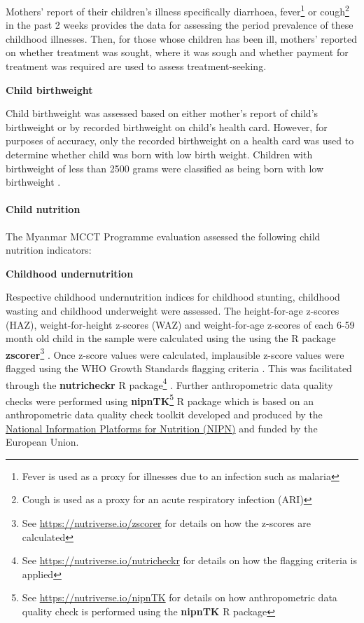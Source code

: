 \documentclass[12pt,a4paper]{article}
\let\oldparagraph\paragraph
\renewcommand{\paragraph}[1]{\oldparagraph{#1}\mbox{}}
\let\rmarkdownfootnote\footnote%
\def\footnote{\protect\rmarkdownfootnote}
\begin{document}
Mothers' report of their children's illness specifically diarrhoea, fever\footnote{Fever is used as a proxy for illnesses due to an infection such as malaria} or cough\footnote{Cough is used as a proxy for an acute respiratory infection (ARI)} in the past 2 weeks provides the data for assessing the period prevalence of these childhood illnesses. Then, for those whose children has been ill, mothers' reported on whether treatment was sought, where it was sough and whether payment for treatment was required are used to assess treatment-seeking.

\textbf{Child birthweight}

Child birthweight was assessed based on either mother's report of child's birthweight or by recorded birthweight on child's health card. However, for purposes of accuracy, only the recorded birthweight on a health card was used to determine whether child was born with low birth weight. Children with birthweight of less than 2500 grams were classified as being born with low birthweight \citep{Woertman:1993hp, Kelly:1997wa}.

\hypertarget{cnut}{%
\paragraph{Child nutrition}\label{cnut}}

The Myanmar MCCT Programme evaluation assessed the following child nutrition indicators:

\textbf{Childhood undernutrition}

Respective childhood undernutrition indices for childhood stunting, childhood wasting and childhood underweight were assessed. The height-for-age z-scores (HAZ), weight-for-height z-scores (WAZ) and weight-for-age z-scores of each 6-59 month old child in the sample were calculated using the using the R package \textbf{zscorer}\footnote{See \url{https://nutriverse.io/zscorer} for details on how the z-scores are calculated} \citep{zscorer2019}. Once z-score values were calculated, implausible z-score values were flagged using the WHO Growth Standards flagging criteria \citep{WorldHealthOrganizationWHO2006}. This was facilitated through the \textbf{nutricheckr} R package\footnote{See \url{https://nutriverse.io/nutricheckr} for details on how the flagging criteria is applied} \citep{nutricheckr2019}. Further anthropometric data quality checks were performed using \textbf{nipnTK}\footnote{See \url{https://nutriverse.io/nipnTK} for details on how anthropometric data quality check is performed using the \textbf{nipnTK} R package} \citep{nipnTK2019} R package which is based on an anthropometric data quality check toolkit developed and produced by the \href{http://www.nipn-nutrition-platforms.org}{National Information Platforms for Nutrition (NIPN)} and funded by the European Union.
\end{document}
